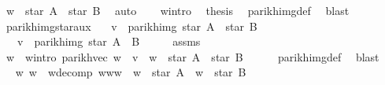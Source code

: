 \begin{isabellebody}
\ {\isachardoublequoteopen}w\ {\isasymin}\ star\ A\ {\isacharat}{\kern0pt}{\isacharat}{\kern0pt}\ star\ B{\isachardoublequoteclose}\ \isamarkupfalse%
\ auto\isanewline
\ \ \isamarkupfalse%
\ w{\isacharunderscore}{\kern0pt}intro\ \isamarkupfalse%
\ {\isacharquery}{\kern0pt}thesis\ \isamarkupfalse%
\ parikh{\isacharunderscore}{\kern0pt}img{\isacharunderscore}{\kern0pt}def\ \isamarkupfalse%
\ blast\isanewline
{}\isamarkupfalse%
%
\endisatagproof
{\isafoldproof}%
%
\isadelimproof
\isanewline
%
\endisadelimproof
\isanewline
{}\isamarkupfalse%
\ parikh{\isacharunderscore}{\kern0pt}img{\isacharunderscore}{\kern0pt}star{\isacharunderscore}{\kern0pt}aux{}{\isacharcolon}{\kern0pt}\isanewline
\ \ \ {\isachardoublequoteopen}v\ {\isasymin}\ parikh{\isacharunderscore}{\kern0pt}img\ {\isacharparenleft}{\kern0pt}star\ A\ {\isacharat}{\kern0pt}{\isacharat}{\kern0pt}\ star\ B{\isacharparenright}{\kern0pt}{\isachardoublequoteclose}\isanewline
\ \ \ {\isachardoublequoteopen}v\ {\isasymin}\ parikh{\isacharunderscore}{\kern0pt}img\ {\isacharparenleft}{\kern0pt}star\ {\isacharparenleft}{\kern0pt}A\ {\isasymunion}\ B{\isacharparenright}{\kern0pt}{\isacharparenright}{\kern0pt}{\isachardoublequoteclose}\isanewline
%
\isadelimproof
%
\endisadelimproof
%
\isatagproof
{}\isamarkupfalse%
\ {\isacharminus}{\kern0pt}\isanewline
\ \ \isamarkupfalse%
\ assms\ \isamarkupfalse%
\ w\ \ w{\isacharunderscore}{\kern0pt}intro{\isacharcolon}{\kern0pt}\ {\isachardoublequoteopen}parikh{\isacharunderscore}{\kern0pt}vec\ w\ {\isacharequal}{\kern0pt}\ v\ {\isasymand}\ w\ {\isasymin}\ star\ A\ {\isacharat}{\kern0pt}{\isacharat}{\kern0pt}\ star\ B{\isachardoublequoteclose}\isanewline
\ \ \ \ \isamarkupfalse%
\ parikh{\isacharunderscore}{\kern0pt}img{\isacharunderscore}{\kern0pt}def\ \isamarkupfalse%
\ blast\isanewline
\ \ \isamarkupfalse%
\ \isamarkupfalse%
\ w{}\ w{}\ \ w{\isacharunderscore}{\kern0pt}decomp{\isacharcolon}{\kern0pt}\ {\isachardoublequoteopen}w{\isacharequal}{\kern0pt}w{}{\isacharat}{\kern0pt}w{}\ {\isasymand}\ w{}\ {\isasymin}\ star\ A\ {\isasymand}\ w{}\ {\isasymin}\ star\ B{\isachardoublequoteclose}\ \isamarkupfalse%

\end{isabellebody}
